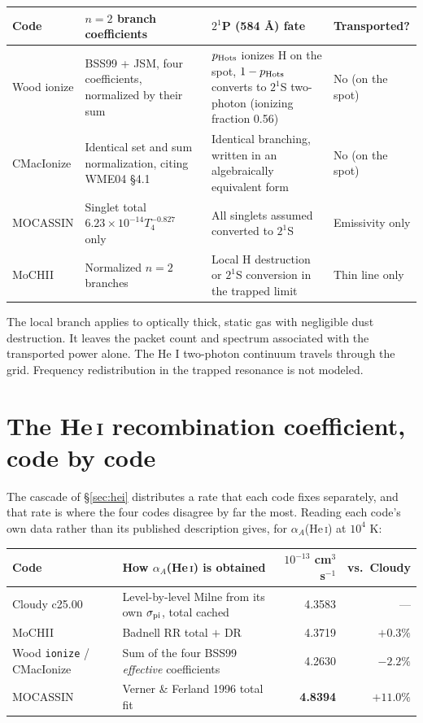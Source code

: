 \documentclass[11pt]{my_memo}
\begin{document}
\begin{table}[t]\centering
\begin{tabularx}{\textwidth}{p{20mm}XXp{19mm}}\toprule
Code&$n=2$ branch coefficients&$2^1$P (584 \AA) fate&Transported?\\\midrule
Wood ionize&BSS99 + JSM, four coefficients, normalized by their sum&$p_{\rm Hots}$ ionizes H on the spot, $1-p_{\rm Hots}$ converts to $2^1$S two-photon (ionizing fraction 0.56)&No (on the spot)\\
CMacIonize&Identical set and sum normalization, citing WME04 \S4.1&Identical branching, written in an algebraically equivalent form&No (on the spot)\\
MOCASSIN&Singlet total $6.23\times10^{-14}T_4^{-0.827}$ only&All singlets assumed converted to $2^1$S&Emissivity only\\
MoCHII&Normalized $n=2$ branches&Local H destruction or $2^1$S conversion in the trapped limit&Thin line only\\\bottomrule
\end{tabularx}
\end{table}

The local branch applies to optically thick, static gas with negligible
dust destruction. It leaves the packet count and spectrum associated with
the transported power alone. The He I two-photon continuum travels through
the grid. Frequency redistribution in the trapped resonance is not modeled.

\section{The He\,\textsc{i} recombination coefficient, code by code}\label{sec:heirec}
The cascade of \S\ref{sec:hei} distributes a rate that each code fixes separately, and that rate is where the four codes disagree by far the most.  Reading each code's own data rather than its published description gives, for $\alpha_A$(He\,\textsc{i}) at $10^4$ K:

\begin{center}\small
\begin{tabular}{@{}llrr@{}}\toprule
Code&How $\alpha_A$(He\,\textsc{i}) is obtained&$10^{-13}$ cm$^3$ s$^{-1}$&vs.\ Cloudy\\\midrule
Cloudy c25.00&Level-by-level Milne from its own $\sigma_{\rm pi}$, total cached&4.3583&---\\
MoCHII&Badnell RR total $+$ DR&4.3719&$+0.3\%$\\
Wood \texttt{ionize} / CMacIonize&Sum of the four BSS99 \emph{effective} coefficients&4.2630&$-2.2\%$\\
MOCASSIN&Verner \& Ferland 1996 total fit&\textbf{4.8394}&$\mathbf{+11.0\%}$\\\bottomrule
\end{tabular}
\end{center}
\end{document}
